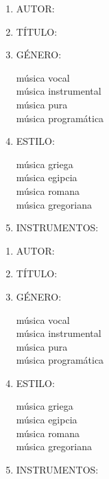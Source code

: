 \documentclass[letterpaper,12pt,notitlepage,spanish]{article}
\begin{document}
\begin{multicols}{2}
%
\begin{ejercicio}[]
	\begin{enumerate}[1.-]
%
% 
			\vspace*{0.3cm}
		\item
			AUTOR: \dotfill
			\vspace*{0.3cm}
		\item
			TÍTULO: \dotfill
			\vspace*{0.3cm}
		\item
			GÉNERO:\dotfill \par
			música vocal\\
			música instrumental\\
			música pura\\
			música programática
			\vspace*{0.3cm}			
		\item
			ESTILO: \dotfill \par
			música griega\\
			música egipcia\\
			música romana\\
			música gregoriana
			\vspace*{0.3cm}			
		\item
			INSTRUMENTOS:\dotfill \par
			\vspace*{1.00cm}
%
	\end{enumerate}
\end{ejercicio}
%
%
\begin{ejercicio}[]
	\begin{enumerate}[1.-]
%
% 
			\vspace*{0.3cm}
		\item
			AUTOR: \dotfill
			\vspace*{0.3cm}
		\item
			TÍTULO: \dotfill
			\vspace*{0.3cm}
		\item
			GÉNERO:\dotfill \par
			música vocal\\
			música instrumental\\
			música pura\\
			música programática
			\vspace*{0.3cm}			
		\item
			ESTILO: \dotfill \par
			música griega\\
			música egipcia\\
			música romana\\
			música gregoriana
			\vspace*{0.3cm}			
		\item
			INSTRUMENTOS:\dotfill \par
			\vspace*{1.00cm}
%
	\end{enumerate}
\end{ejercicio}
%
\end{multicols}
\end{document}
